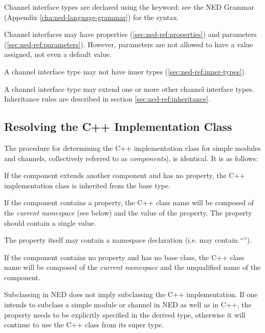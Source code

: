 Channel interface types are declared using the  keyword;
see the NED Grammar (Appendix \ref{cha:ned-language-grammar}) for the
syntax.

Channel interfaces may have properties (\ref{sec:ned-ref:properties}) and
parameters (\ref{sec:ned-ref:parameters}). However, parameters are not
allowed to have a value assigned, not even a default value.

A channel interface type may not have inner types (\ref{sec:ned-ref:inner-types}).

A channel interface type may extend one or more other channel interface types.
Inheritance rules are described in section \ref{sec:ned-ref:inheritance}.



\subsection{Resolving the C++ Implementation Class}
\label{sec:ned-ref:resolving-cpp-class}

The procedure for determining the C++ implementation class for simple modules
and channels, collectively referred to as \textit{components}), is identical.
It is as follows:

If the component extends another component and has no 
property, the C++ implementation class is inherited from the base type.

If the component contains a  property, the C++ class name
will be composed of the \textit{current namespace} (see below) and the
value of the  property. The  property should
contain a single value.

\begin{note}
    The  property itself may contain a namespace declaration (i.e.
    may contain ``\ttt{::}'').
\end{note}

If the component contains no  property and has no base class,
the C++ class name will be composed of the \textit{current namespace} and the
unqualified name of the component.

\begin{important}
    Subclassing in NED does not imply subclassing the C++ implementation. If one
    intends to subclass a simple module or channel in NED as well as in C++, the
     property needs to be explicitly specified in the derived type,
    otherwise it will continue to use the C++ class from its super type.
\end{important}

